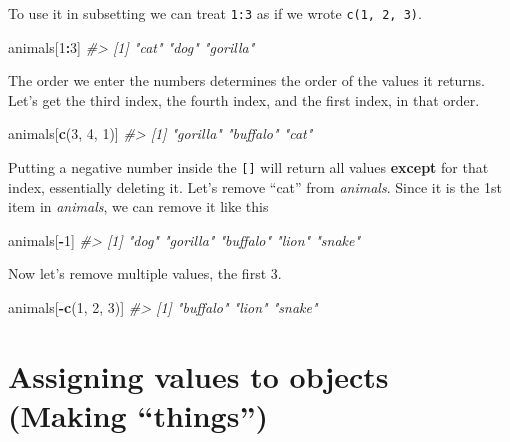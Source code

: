 \documentclass[
  12pt,
]{book}
\newenvironment{Shaded}{\begin{snugshade}}{\end{snugshade}}
\newcommand{\CommentTok}[1]{\textcolor[rgb]{0.37,0.37,0.37}{\textit{#1}}}
\newcommand{\DecValTok}[1]{\textcolor[rgb]{0.06,0.06,0.06}{#1}}
\newcommand{\KeywordTok}[1]{\textcolor[rgb]{0.27,0.27,0.27}{\textbf{#1}}}
\newcommand{\NormalTok}[1]{#1}
\newcommand{\OperatorTok}[1]{\textcolor[rgb]{0.43,0.43,0.43}{\textbf{#1}}}
\begin{document}
To use it in subsetting we can treat \texttt{1:3} as if we wrote \texttt{c(1,\ 2,\ 3)}.

\begin{Shaded}
\begin{Highlighting}[]
\NormalTok{animals[}\DecValTok{1}\OperatorTok{:}\DecValTok{3}\NormalTok{]}
\CommentTok{\#> [1] "cat"     "dog"     "gorilla"}
\end{Highlighting}
\end{Shaded}

The order we enter the numbers determines the order of the values it returns. Let's get the third index, the fourth index, and the first index, in that order.

\begin{Shaded}
\begin{Highlighting}[]
\NormalTok{animals[}\KeywordTok{c}\NormalTok{(}\DecValTok{3}\NormalTok{, }\DecValTok{4}\NormalTok{, }\DecValTok{1}\NormalTok{)]}
\CommentTok{\#> [1] "gorilla" "buffalo" "cat"}
\end{Highlighting}
\end{Shaded}

Putting a negative number inside the \texttt{{[}{]}} will return all values \textbf{except} for that index, essentially deleting it. Let's remove ``cat'' from \emph{animals}. Since it is the 1st item in \emph{animals}, we can remove it like this

\begin{Shaded}
\begin{Highlighting}[]
\NormalTok{animals[}\OperatorTok{{-}}\DecValTok{1}\NormalTok{]}
\CommentTok{\#> [1] "dog"     "gorilla" "buffalo" "lion"    "snake"}
\end{Highlighting}
\end{Shaded}

Now let's remove multiple values, the first 3.

\begin{Shaded}
\begin{Highlighting}[]
\NormalTok{animals[}\OperatorTok{{-}}\KeywordTok{c}\NormalTok{(}\DecValTok{1}\NormalTok{, }\DecValTok{2}\NormalTok{, }\DecValTok{3}\NormalTok{)]}
\CommentTok{\#> [1] "buffalo" "lion"    "snake"}
\end{Highlighting}
\end{Shaded}

\hypertarget{assignment}{%
\section{Assigning values to objects (Making ``things'')}\label{assignment}}
\end{document}

